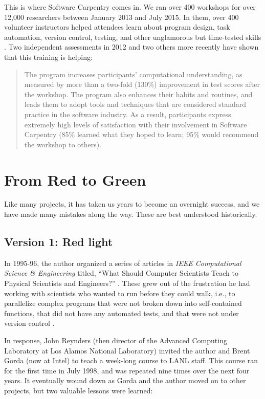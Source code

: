 \documentclass[10pt,a4paper,twocolumn]{article}
\begin{document}
This is where Software Carpentry comes in. We ran over 400 workshops
for over 12,000 researchers between January 2013 and July 2015. In
them, over 400 volunteer instructors helped attendees learn about
program design, task automation, version control, testing, and other
unglamorous but time-tested skills \cite{wilson2013}. Two independent
assessments in 2012 \cite{aranda2012,libarkin2012} and two others more
recently \cite{schossau2014,simperler2015} have shown that this
training is helping:

\begin{quote}
The program increases participants' computational understanding, as
measured by more than a two-fold (130\%) improvement in test scores
after the workshop. The program also enhances their habits and routines,
and leads them to adopt tools and techniques that are considered
standard practice in the software industry. As a result, participants
express extremely high levels of satisfaction with their involvement in
Software Carpentry (85\% learned what they hoped to learn; 95\% would
recommend the workshop to others).
\end{quote}

\section*{From Red to Green}

Like many projects, it has taken us years to become an overnight
success, and we have made many mistakes along the way.  These are best
understood historically.

\subsection*{Version 1: Red light}

In 1995-96, the author organized a series of articles in \emph{IEEE
Computational Science \& Engineering} titled, ``What Should Computer
Scientists Teach to Physical Scientists and Engineers?'' \cite{wilson1996}.
These grew out of the frustration he had working with scientists
who wanted to run before they could walk, i.e., to parallelize complex
programs that were not broken down into self-contained functions, that
did not have any automated tests, and that were not under version control
\cite{wilson2006a}.

In response, John Reynders (then director of the Advanced Computing
Laboratory at Los Alamos National Laboratory) invited the author and
Brent Gorda (now at Intel) to teach a week-long course to LANL staff.
This course ran for the first time in July 1998, and was repeated nine
times over the next four years. It eventually wound down as Gorda and
the author moved on to other projects, but two valuable lessons were
learned:
\end{document}
